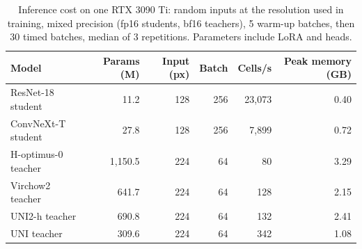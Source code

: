 \begin{table}[htbp]
{\caption{Inference cost on one RTX 3090 Ti: random inputs at the resolution used in training, mixed precision (fp16 students, bf16 teachers), 5 warm-up batches, then 30 timed batches, median of 3 repetitions. Parameters include LoRA and heads.}}
{%
\footnotesize
\setlength{\tabcolsep}{5pt}
\begin{tabular}{@{}lrrrrr@{}}
\toprule
Model & Params (M) & Input (px) & Batch & Cells/s & Peak memory (GB) \\
\midrule
ResNet-18 student & 11.2 & 128 & 256 & 23,073 & 0.40 \\
ConvNeXt-T student & 27.8 & 128 & 256 & 7,899 & 0.72 \\
H-optimus-0 teacher & 1,150.5 & 224 & 64 & 80 & 3.29 \\
Virchow2 teacher & 641.7 & 224 & 64 & 128 & 2.15 \\
UNI2-h teacher & 690.8 & 224 & 64 & 132 & 2.41 \\
UNI teacher & 309.6 & 224 & 64 & 342 & 1.08 \\
\bottomrule
\end{tabular}
}
\end{table}
